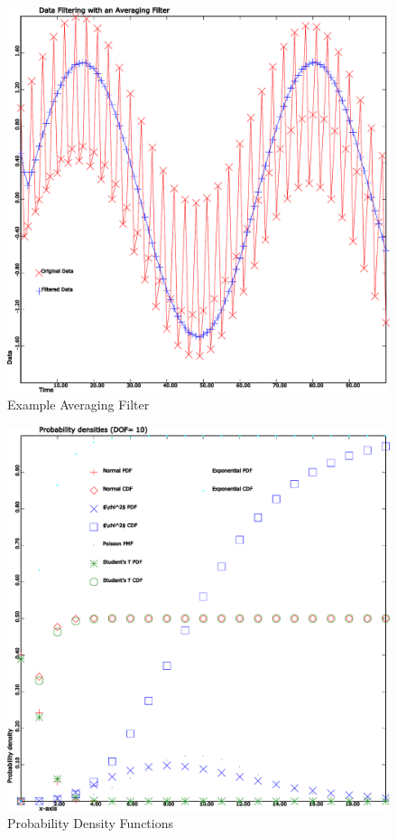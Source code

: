 \documentclass[10pt, openany]{book}
\begin{document}
\begin{figure}
  \includegraphics[scale=0.6]{filter-plot.pdf}
  \caption{Example Averaging Filter}
  \label{svg:Ave}
\end{figure}

\begin{figure}
  \includegraphics[scale=0.6]{stat-plot.pdf}
  \caption{Probability Density Functions}
  \label{svg:Prob}
\end{figure}
\end{document}
